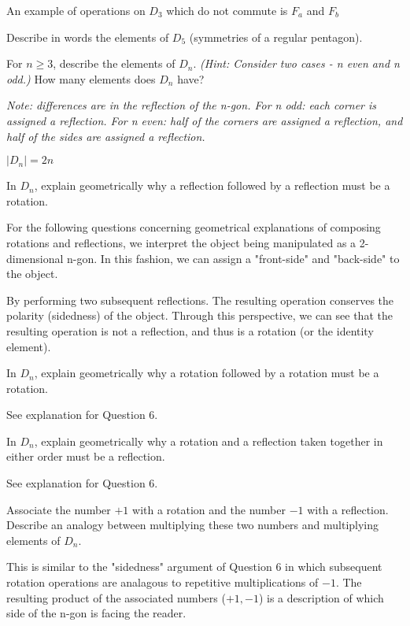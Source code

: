 \documentclass[11pt,largemargins]{homework}
\begin{document}
\quad An example of operations on $D_3$ which do not commute is $F_a$ and $F_b$


\question 
Describe in words the elements of $D_5$ (symmetries of a regular pentagon).


\question 
For $n\geq 3$, describe the elements of $D_n$. \textit{(Hint: Consider two cases - n even and n odd.)} 
How many elements does $D_n$ have?

\quad \textit{Note: differences are in the reflection of the n-gon. For n odd: each corner is assigned a reflection. For n even: 
half of the corners are assigned a reflection, and half of the sides are assigned a reflection.}

\quad $|D_n| = 2n$

\question 
In $D_n$, explain geometrically why a reflection followed by a reflection must be a rotation.

\quad For the following questions concerning geometrical explanations of composing rotations and reflections, we 
interpret the object being manipulated as a 2-dimensional n-gon. In this fashion, we can assign a "front-side" and "back-side" 
to the object. 

\quad By performing two subsequent reflections. The resulting operation conserves the polarity (sidedness) of the object. Through
this perspective, we can see that the resulting operation is not a reflection, and thus is a rotation (or the identity element).


\question 
In $D_n$, explain geometrically why a rotation followed by a rotation must be a rotation.

\quad See explanation for Question 6.

\question 
In $D_n$, explain geometrically why a rotation and a reflection taken together in either order must be a reflection.

\quad See explanation for Question 6.

\question 
Associate the number $+1$ with a rotation and the number $-1$ with a reflection. Describe an analogy between 
multiplying these two numbers and multiplying elements of $D_n$.

\quad This is similar to the "sidedness" argument of Question 6 in which subsequent rotation operations are analagous 
to repetitive multiplications of $-1$. The resulting product of the associated numbers ($+1, -1$) is a description of 
which side of the n-gon is facing the reader. 
\end{document}

